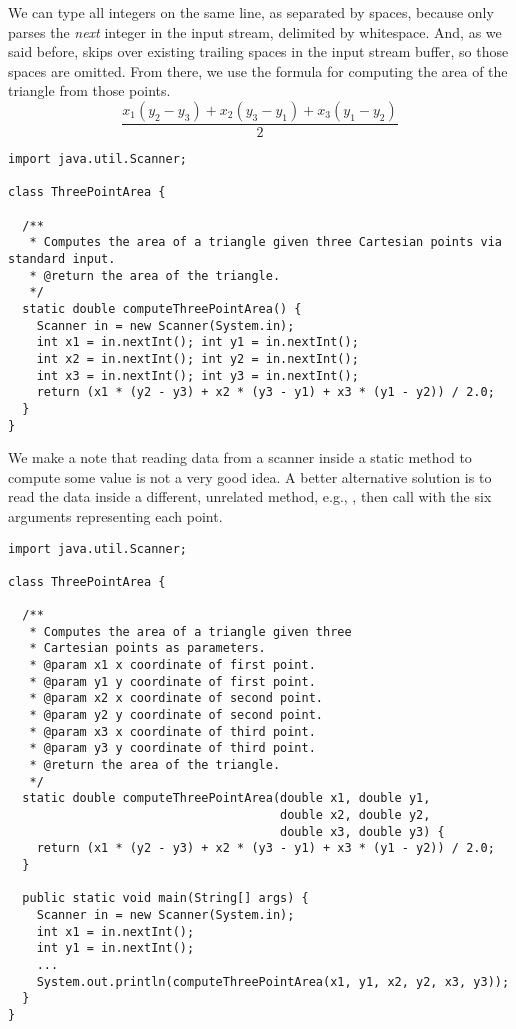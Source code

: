 We can type all integers on the same line, as separated by spaces, because  only parses the \emph{next} integer in the input stream, delimited by whitespace. 
And, as we said before,  skips over existing trailing spaces in the input stream buffer, so those spaces are omitted. 
From there, we use the formula for computing the area of the triangle from those points.
\[
\dfrac{x_1(y_2 - y_3) + x_2(y_3 - y_1) + x_3 (y_1 - y_2)}{2}
\]
\enlargethispage{2\baselineskip}
\begin{lstlisting}[language=MyJava]
import java.util.Scanner;

class ThreePointArea {

  /**
   * Computes the area of a triangle given three Cartesian points via standard input.
   * @return the area of the triangle.
   */
  static double computeThreePointArea() {
    Scanner in = new Scanner(System.in);
    int x1 = in.nextInt(); int y1 = in.nextInt();
    int x2 = in.nextInt(); int y2 = in.nextInt();
    int x3 = in.nextInt(); int y3 = in.nextInt();
    return (x1 * (y2 - y3) + x2 * (y3 - y1) + x3 * (y1 - y2)) / 2.0;
  }
}
\end{lstlisting}

We make a note that reading data from a scanner inside a static method to compute some value is not a very good idea. 
A better alternative solution is to read the data inside a different, unrelated method, e.g., , then call  with the six arguments representing each point.

\begin{lstlisting}[language=MyJava]
import java.util.Scanner;

class ThreePointArea {
  
  /**
   * Computes the area of a triangle given three 
   * Cartesian points as parameters.
   * @param x1 x coordinate of first point.
   * @param y1 y coordinate of first point.
   * @param x2 x coordinate of second point.
   * @param y2 y coordinate of second point.
   * @param x3 x coordinate of third point.
   * @param y3 y coordinate of third point.
   * @return the area of the triangle.
   */
  static double computeThreePointArea(double x1, double y1,
                                      double x2, double y2,
                                      double x3, double y3) {
    return (x1 * (y2 - y3) + x2 * (y3 - y1) + x3 * (y1 - y2)) / 2.0;
  }

  public static void main(String[] args) {
    Scanner in = new Scanner(System.in);
    int x1 = in.nextInt();
    int y1 = in.nextInt();
    ...
    System.out.println(computeThreePointArea(x1, y1, x2, y2, x3, y3));
  }
}
\end{lstlisting}

